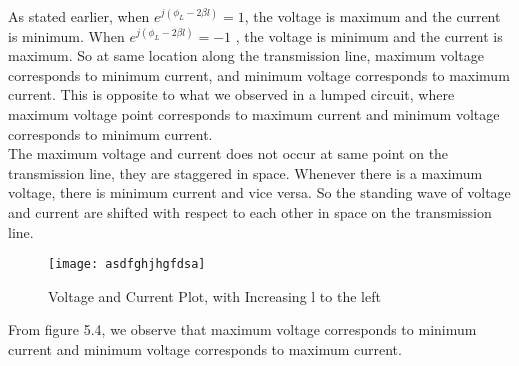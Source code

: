 	 As stated earlier, when $ e^{j(\phi_L - 2 \beta l)} = 1$, the voltage is maximum and the current is minimum. When $ e^{j(\phi_L - 2 \beta l)} = -1$ , the voltage is minimum and the current is maximum. So at same location along the transmission line, maximum voltage corresponds to minimum current, and minimum voltage corresponds to maximum current. This is opposite to what we observed in a lumped circuit, where maximum voltage point corresponds to maximum current and minimum voltage corresponds to minimum current.\\
	 The maximum voltage and current does not occur at same point on the transmission line, they are staggered in space. Whenever there is a maximum voltage, there is minimum current and vice versa. So the standing wave of voltage and current are shifted with respect to each other in space on the transmission line. 
	\begin{figure}[h]
		\centering
		\texttt{[image: asdfghjhgfdsa]}
		\caption{Voltage and Current Plot, with Increasing l to the left}
		\label{fig:asdfghjhgfdsa}
	\end{figure}
	
	From figure 5.4, we observe that maximum voltage corresponds to minimum current and minimum voltage corresponds to maximum current.
